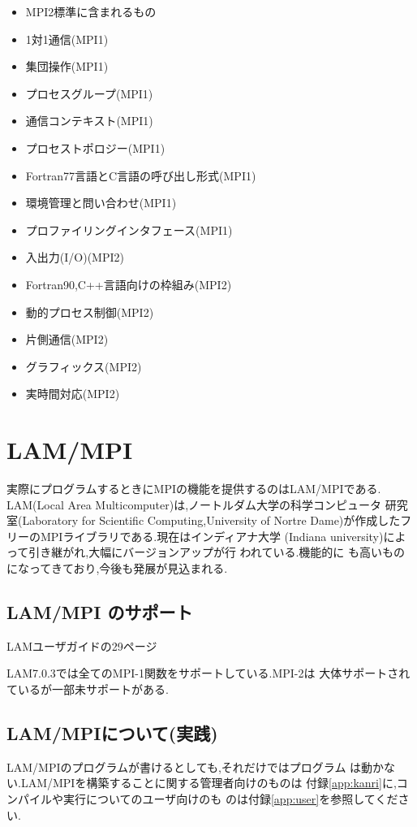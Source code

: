 \documentclass[a4paper,titlepage]{jreport}
\begin{document}
\begin{itemize}
\item[] MPI2標準に含まれるもの
\item 1対1通信(MPI1)
\item 集団操作(MPI1)
\item プロセスグループ(MPI1)
\item 通信コンテキスト(MPI1)
\item プロセストポロジー(MPI1)
\item Fortran77言語とC言語の呼び出し形式(MPI1)
\item 環境管理と問い合わせ(MPI1)
\item プロファイリングインタフェース(MPI1)
\item 入出力(I/O)(MPI2)
\item Fortran90,C++言語向けの枠組み(MPI2)
\item 動的プロセス制御(MPI2)
\item 片側通信(MPI2)
\item グラフィックス(MPI2)
\item 実時間対応(MPI2)
\end{itemize}

\section{LAM/MPI}
実際にプログラムするときにMPIの機能を提供するのはLAM/MPIである.
LAM(Local Area Multicomputer)は,ノートルダム大学の科学コンピュータ
研究室(Laboratory for Scientific Computing,University of Nortre
 Dame)が作成したフリーのMPIライブラリである.現在はインディアナ大学
(Indiana university)によって引き継がれ,大幅にバージョンアップが行
われている.機能的に
も高いものになってきており,今後も発展が見込まれる.

\subsection{LAM/MPI のサポート}
LAMユーザガイドの29ページ

LAM7.0.3では全てのMPI-1関数をサポートしている.MPI-2は
大体サポートされているが一部未サポートがある.

\subsection{LAM/MPIについて(実践)}
LAM/MPIのプログラムが書けるとしても,それだけではプログラム
は動かない.LAM/MPIを構築することに関する管理者向けのものは
付録\ref{app:kanri}に,コンパイルや実行についてのユーザ向けのも
のは付録\ref{app:user}を参照してください.
\end{document}
